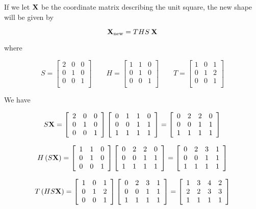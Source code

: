 \documentclass[12pt]{article}
\newcommand{\hs}{\hspace{.75mm}}
\newcommand{\nin}{\noindent}
\newcommand{\vthree}{\vspace{3mm}}
\newcommand{\myp}[1]{\left( #1 \right)}
\newcommand{\mymat}[1]{
\left[
\begin{array}{rrrrrrrrrrrrrrrrrrrrrrrrrrrrrrrrrrrrrrr}
#1
\end{array}
\right]
}
\begin{document}
\vthree

\nin If we let ${\bf X}$ be the coordinate matrix describing the unit square, the new shape will be given by

\[
{\bf X}_{\textrm{new}} = THS \hs {\bf X}
\]

\vthree

\nin where

\vthree

\[
S =
\mymat{
2 & 0 & 0 \\
0 & 1 & 0 \\
0 & 0 & 1 \\
}
\quad \quad
H =
\mymat{
1 & 1 & 0 \\
0 & 1 & 0 \\
0 & 0 & 1 \\
}
\quad \quad
T =
\mymat{
1 & 0 & 1 \\
0 & 1 & 2 \\
0 & 0 & 1 \\
}
\]

\clearpage

\nin We have

\[
S{\bf X} =
\mymat{
2 & 0 & 0 \\
0 & 1 & 0 \\
0 & 0 & 1 \\
}
\mymat{
0 & 1 & 1 & 0 \\
0 & 0 & 1 & 1 \\
1 & 1 & 1 & 1 \\
}
=
\mymat{
0 & 2 & 2 & 0 \\
0 & 0 & 1 & 1 \\
1 & 1 & 1 & 1 \\
}
\]

\vthree

\[
H\myp{S{\bf X}} =
\mymat{
1 & 1 & 0 \\
0 & 1 & 0 \\
0 & 0 & 1 \\
}
\mymat{
0 & 2 & 2 & 0 \\
0 & 0 & 1 & 1 \\
1 & 1 & 1 & 1 \\
}
=
\mymat{
0 & 2 & 3 & 1 \\
0 & 0 & 1 & 1 \\
1 & 1 & 1 & 1 \\
}
\]

\vthree

\[
T\myp{HS{\bf X}} =
\mymat{
1 & 0 & 1 \\
0 & 1 & 2 \\
0 & 0 & 1 \\
}
\mymat{
0 & 2 & 3 & 1 \\
0 & 0 & 1 & 1 \\
1 & 1 & 1 & 1 \\
}
=
\mymat{
1 & 3 & 4 & 2 \\
2 & 2 & 3 & 3 \\
1 & 1 & 1 & 1 \\
}
\]
\end{document}
